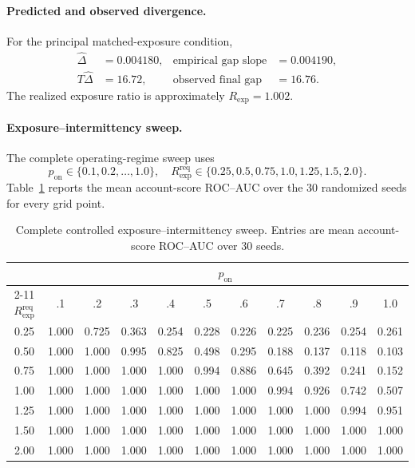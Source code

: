 \paragraph{Predicted and observed divergence.}
For the principal matched-exposure condition,
\[
\begin{aligned}
\widehat\Delta &= 0.004180,
&
\text{empirical gap slope} &= 0.004190,\\
T\widehat\Delta &= 16.72,
&
\text{observed final gap} &= 16.76.
\end{aligned}
\]
The realized exposure ratio is approximately $R_{\mathrm{exp}}=1.002$.

\paragraph{Exposure--intermittency sweep.}
The complete operating-regime sweep uses
\[
p_{\mathrm{on}}\in\{0.1,0.2,\ldots,1.0\},
\quad
R_{\mathrm{exp}}^{\mathrm{req}}
\in
\{0.25,0.5,0.75,1.0,1.25,1.5,2.0\}.
\]
Table~\ref{tab:supp-controlled-grid} reports the mean account-score ROC--AUC
over the 30 randomized seeds for every grid point.

\begin{table}[t]
\caption{Complete controlled exposure--intermittency sweep. Entries are mean
account-score ROC--AUC over 30 seeds.}
\label{tab:supp-controlled-grid}
\centering
\small
\setlength{\tabcolsep}{4.2pt}
\renewcommand{\arraystretch}{1.08}
\begin{tabular}{@{}c*{10}{c}@{}}
\toprule
& \multicolumn{10}{c}{$p_{\mathrm{on}}$} \\
\cmidrule(lr){2-11}
$R_{\mathrm{exp}}^{\mathrm{req}}$
& .1 & .2 & .3 & .4 & .5 & .6 & .7 & .8 & .9 & 1.0 \\
\midrule
0.25
& 1.000 & 0.725 & 0.363 & 0.254 & 0.228
& 0.226 & 0.225 & 0.236 & 0.254 & 0.261 \\
0.50
& 1.000 & 1.000 & 0.995 & 0.825 & 0.498
& 0.295 & 0.188 & 0.137 & 0.118 & 0.103 \\
0.75
& 1.000 & 1.000 & 1.000 & 1.000 & 0.994
& 0.886 & 0.645 & 0.392 & 0.241 & 0.152 \\
1.00
& 1.000 & 1.000 & 1.000 & 1.000 & 1.000
& 1.000 & 0.994 & 0.926 & 0.742 & 0.507 \\
1.25
& 1.000 & 1.000 & 1.000 & 1.000 & 1.000
& 1.000 & 1.000 & 1.000 & 0.994 & 0.951 \\
1.50
& 1.000 & 1.000 & 1.000 & 1.000 & 1.000
& 1.000 & 1.000 & 1.000 & 1.000 & 1.000 \\
2.00
& 1.000 & 1.000 & 1.000 & 1.000 & 1.000
& 1.000 & 1.000 & 1.000 & 1.000 & 1.000 \\
\bottomrule
\end{tabular}
\end{table}

